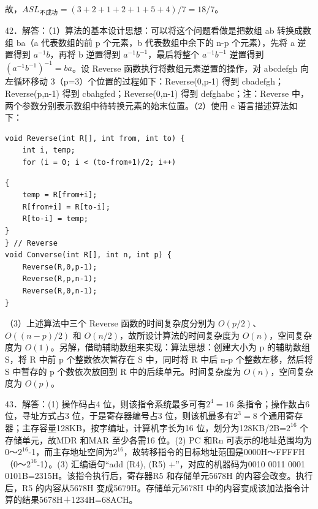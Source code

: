 \documentclass[UTF8,11pt]{ctexart}
\begin{document}
故，\(\displaystyle ASL_{\text{不成功}}=(3+2+1+2+1+5+4)/7=18/7\)。


42．解答：（1）算法的基本设计思想：可以将这个问题看做是把数组 ab 转换成数组 ba（a 代表数组的前 p 个元素，b 代表数组中余下的 n-p 个元素），先将 a 逆置得到 \(\displaystyle a^{-1}b\)，再将 b 逆置得到 \(\displaystyle a^{-1}b^{-1}\)，最后将整个 \(\displaystyle a^{-1}b^{-1}\) 逆置得到\(\displaystyle (a^{-1}b^{-1})^{-1}=ba\)。设 Reverse 函数执行将数组元素逆置的操作，对 abcdefgh 向左循环移动 3（p=3）个位置的过程如下：Reverse(0,p-1) 得到 cbadefgh；Reverse(p,n-1) 得到 cbahgfed；Reverse(0,n-1) 得到 defghabc；注：Reverse 中，两个参数分别表示数组中待转换元素的始末位置。（2）使用 c 语言描述算法如下：


\begin{Verbatim}[breaklines,breakanywhere,fontsize=\small]
void Reverse(int R[], int from, int to) {
    int i, temp;
    for (i = 0; i < (to-from+1)/2; i++)
\end{Verbatim}

\begin{Verbatim}[breaklines,breakanywhere,fontsize=\small]
{
    temp = R[from+i];
    R[from+i] = R[to-i];
    R[to-i] = temp;
}
} // Reverse
void Converse(int R[], int n, int p) {
    Reverse(R,0,p-1);
    Reverse(R,p,n-1);
    Reverse(R,0,n-1);
}
\end{Verbatim}

（3）上述算法中三个 Reverse 函数的时间复杂度分别为 \(\displaystyle O(p/2)\)、\(\displaystyle O((n-p)/2)\) 和 \(\displaystyle O(n/2)\)，故所设计算法的时间复杂度为 \(\displaystyle O(n)\)，空间复杂度为 \(\displaystyle O(1)\)。另解，借助辅助数组来实现：算法思想：创建大小为 p 的辅助数组 S，将 R 中前 p 个整数依次暂存在 S 中，同时将 R 中后 n-p 个整数左移，然后将 S 中暂存的 p 个数依次放回到 R 中的后续单元。时间复杂度为 \(\displaystyle O(n)\)，空间复杂度为 \(\displaystyle O(p)\)。


43．解答：(1) 操作码占4 位，则该指令系统最多可有\(\displaystyle 2^4=16\) 条指令；操作数占6 位，寻址方式占3 位，于是寄存器编号占3 位，则该机最多有\(\displaystyle 2^3=8\) 个通用寄存器；主存容量128KB，按字编址，计算机字长为16 位，划分为128KB/2B=\(\displaystyle 2^{16}\) 个存储单元，故MDR 和MAR 至少各需16 位。(2) PC 和Rn 可表示的地址范围均为0～\(\displaystyle 2^{16}\)-1，而主存地址空间为\(\displaystyle 2^{16}\)，故转移指令的目标地址范围是0000H～FFFFH（0～\(\displaystyle 2^{16}\)-1）。(3) 汇编语句“add (R4), (R5) +”，对应的机器码为0010 0011 0001 0101B=2315H。该指令执行后，寄存器R5 和存储单元5678H 的内容会改变。执行后，R5 的内容从5678H 变成5679H。存储单元5678H 中的内容变成该加法指令计算的结果5678H＋1234H=68ACH。
\end{document}

